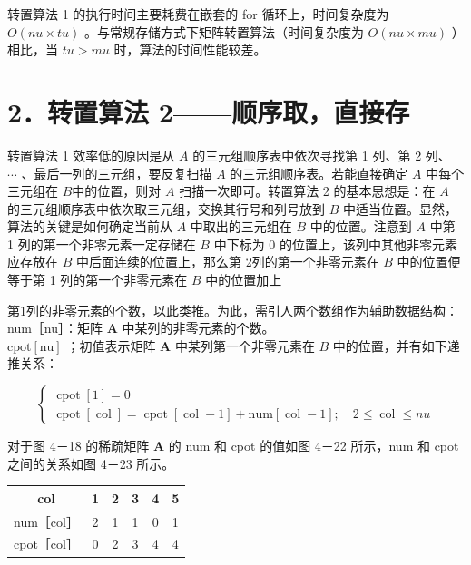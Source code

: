 \documentclass[10pt]{article}
\begin{document}
转置算法 1 的执行时间主要耗费在嵌套的 for 循环上，时间复杂度为 $O(n u \times t u)$ 。与常规存储方式下矩阵转置算法（时间复杂度为 $O(n u \times m u)$ ）相比，当 $t u>m u$ 时，算法的时间性能较差。

\section*{2．转置算法 2——顺序取，直接存}
转置算法 1 效率低的原因是从 $A$ 的三元组顺序表中依次寻找第 1 列、第 2 列、 $\cdots$ 、最后一列的三元组，要反复扫描 $A$ 的三元组顺序表。若能直接确定 $A$ 中每个三元组在 $B$中的位置，则对 $A$ 扫描一次即可。转置算法 2 的基本思想是：在 $A$ 的三元组顺序表中依次取三元组，交换其行号和列号放到 $B$ 中适当位置。显然，算法的关键是如何确定当前从 $A$ 中取出的三元组在 $B$ 中的位置。注意到 $A$ 中第 1 列的第一个非零元素一定存储在 $B$ 中下标为 0 的位置上，该列中其他非零元素应存放在 $B$ 中后面连续的位置上，那么第 2列的第一个非零元素在 $B$ 中的位置便等于第 1 列的第一个非零元素在 $B$ 中的位置加上

第1列的非零元素的个数，以此类推。为此，需引人两个数组作为辅助数据结构：\\
num［nu］：矩阵 $\boldsymbol{A}$ 中某列的非零元素的个数。\\
$\mathrm{cpot}[\mathrm{nu}]$ ；初值表示矩阵 $\boldsymbol{A}$ 中某列第一个非零元素在 $B$ 中的位置，并有如下递推关系：

\[
\left\{\begin{array}{l}
\operatorname{cpot}[1]=0  \tag{4-3}\\
\operatorname{cpot}[\operatorname{col}]=\operatorname{cpot}[\operatorname{col}-1]+\mathrm{num}[\operatorname{col}-1] ; \quad 2 \leqslant \operatorname{col} \leqslant n u
\end{array}\right.
\]

对于图 4－18 的稀疏矩阵 $\boldsymbol{A}$ 的 num 和 cpot 的值如图 4－22 所示，num 和 cpot 之间的关系如图 4－23 所示。

\begin{center}
\begin{tabular}{|c|c|c|c|c|c|}
\hline
col & 1 & 2 & 3 & 4 & 5 \\
\hline
num［col］ & 2 & 1 & 1 & 0 & 1 \\
\hline
cpot［col］ & 0 & 2 & 3 & 4 & 4 \\
\hline
\end{tabular}
\end{center}
\end{document}
